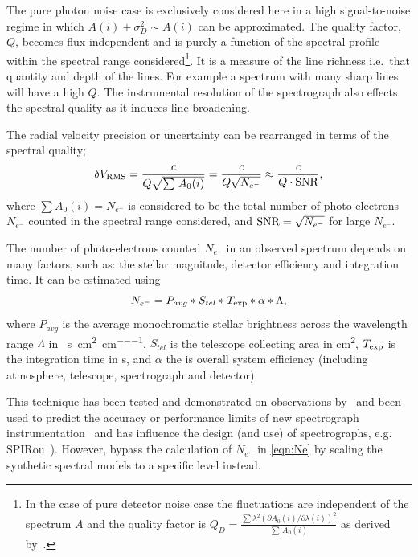 The pure photon noise case is exclusively considered here in a high signal-to-noise regime in which \({A(i) + \sigma_{D}^{2}} \sim {A(i)}\) can be approximated. The quality factor, \(Q\), becomes flux independent and is purely a function of the spectral profile within the spectral range considered\footnote{In the case of pure detector noise case the fluctuations are independent of the spectrum \(A\) and the quality factor is \({Q}_{D} = \frac{\sum{{\lambda}^{2} {(\partial {A}_{0}(i)/\partial \lambda(i))}^{2}}}{\sum{\, {A}_{0}(i)}}\) as derived by~\cite{connes_absolute_1985}.}.
It is a measure of the line richness i.e.\ that quantity and depth of the lines.
For example a spectrum with many sharp lines will have a high \(Q\).
The instrumental resolution of the spectrograph also effects the spectral quality as it induces line broadening.

The radial velocity precision or uncertainty can be rearranged in terms of the spectral quality;
\begin{equation}
    \delta V_{\textrm{RMS}} = \frac{c}{Q \sqrt{\sum {\,{A}_{0}(i)}}} = \frac{c}{Q \sqrt{{N}_{{e}^{-}}}} \approx \frac{c}{Q \cdot \textrm{SNR}{}},  \label{eqn:snr_relation}
\end{equation}
where \(\sum {A}_{0}(i) = {N}_{{e}^{-}}\) is considered to be the total number of photo-electrons \({N}_{{e}^{-}}\) counted in the spectral range considered, and \(\textrm{SNR}{}=\sqrt{N_{{e}^{-}}}\) for large \(N_{{e}^{-}}\).

The number of photo-electrons counted \(N_{{e}^{-}}\) in an observed spectrum depends on many factors, such as: the stellar magnitude, detector efficiency and integration time.
It can be estimated using
\begin{equation}
     N_{{e}^{-}} = P_{avg} * S_{tel} * T_{\textrm{exp}} * \alpha* \Lambda, \label{eqn:Ne}
\end{equation}
where \(P_{avg}\) is the average monochromatic stellar brightness
across the wavelength range \(\Lambda\) in \si{\photons\per\second\per\centi\metre\squared\per\centi\metre},
\(S_{tel}\) is the telescope collecting area in \si{\centi\metre\squared},
\(T_{\textrm{exp}}\) is the integration time in \si{\second}, and \(\alpha\) the is overall system efficiency (including atmosphere, telescope, spectrograph and detector).

This technique has been tested and demonstrated on observations by~\citet{connes_demonstration_1996} and been used to predict the accuracy or performance limits of new spectrograph instrumentation~\citep[e.g.][]{connes_absolute_1985,butler_attaining_1996,bouchy_fundamental_2001} and has influence the design (and use) of spectrographs, e.g. SPIRou~\citep{artigau_spirou_2014,figueira_radial_2016}).
However, \citet{figueira_radial_2016} bypass the calculation of \(N_{{e}^{-}}\) in \cref{eqn:Ne} by scaling the synthetic spectral models to a specific \snr{} level instead.

